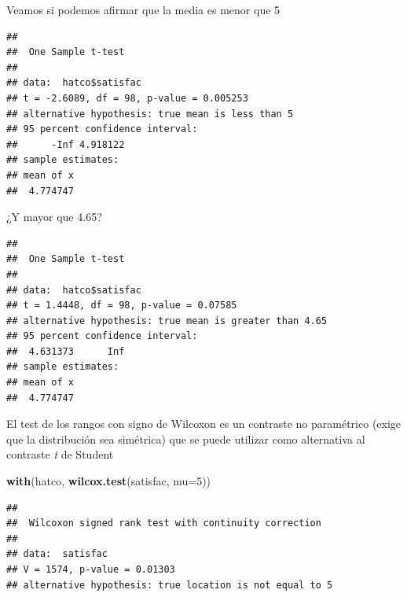 \documentclass[]{book}
\newenvironment{Shaded}{\begin{snugshade}}{\end{snugshade}}
\newcommand{\DataTypeTok}[1]{\textcolor[rgb]{0.13,0.29,0.53}{#1}}
\newcommand{\DecValTok}[1]{\textcolor[rgb]{0.00,0.00,0.81}{#1}}
\newcommand{\FloatTok}[1]{\textcolor[rgb]{0.00,0.00,0.81}{#1}}
\newcommand{\KeywordTok}[1]{\textcolor[rgb]{0.13,0.29,0.53}{\textbf{#1}}}
\newcommand{\NormalTok}[1]{#1}
\newcommand{\OperatorTok}[1]{\textcolor[rgb]{0.81,0.36,0.00}{\textbf{#1}}}
\newcommand{\StringTok}[1]{\textcolor[rgb]{0.31,0.60,0.02}{#1}}
\begin{document}
Veamos si podemos afirmar que la media es menor que 5

\begin{Shaded}
\end{Shaded}

\begin{verbatim}
## 
##  One Sample t-test
## 
## data:  hatco$satisfac
## t = -2.6089, df = 98, p-value = 0.005253
## alternative hypothesis: true mean is less than 5
## 95 percent confidence interval:
##      -Inf 4.918122
## sample estimates:
## mean of x 
##  4.774747
\end{verbatim}

¿Y mayor que 4.65?

\begin{Shaded}
\end{Shaded}

\begin{verbatim}
## 
##  One Sample t-test
## 
## data:  hatco$satisfac
## t = 1.4448, df = 98, p-value = 0.07585
## alternative hypothesis: true mean is greater than 4.65
## 95 percent confidence interval:
##  4.631373      Inf
## sample estimates:
## mean of x 
##  4.774747
\end{verbatim}

El test de los rangos con signo de Wilcoxon es un contraste no paramétrico
(exige que la distribución sea simétrica) que se puede utilizar como
alternativa al contraste \emph{t} de Student

\begin{Shaded}
\begin{Highlighting}[]
\KeywordTok{with}\NormalTok{(hatco, }\KeywordTok{wilcox.test}\NormalTok{(satisfac, }\DataTypeTok{mu=}\DecValTok{5}\NormalTok{))}
\end{Highlighting}
\end{Shaded}

\begin{verbatim}
## 
##  Wilcoxon signed rank test with continuity correction
## 
## data:  satisfac
## V = 1574, p-value = 0.01303
## alternative hypothesis: true location is not equal to 5
\end{verbatim}
\end{document}
